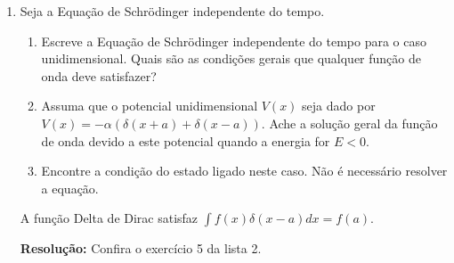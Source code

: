 \documentclass[a4paper, 12pt, notitlepage]{article}
\begin{document}
\begin{enumerate}
\item Seja a Equação de Schrödinger independente do tempo.

\begin{enumerate}
  \item Escreve a Equação de Schrödinger independente do tempo para o caso unidimensional. Quais são as condições gerais que qualquer função de onda deve satisfazer?
  \item Assuma que o potencial unidimensional $V(x)$ seja dado por $V(x) = -\alpha\left(\delta(x+a) + \delta(x-a)\right)$. Ache a solução geral da função de onda devido a este potencial quando a energia for $E < 0$.
  \item Encontre a condição do estado ligado neste caso. Não é necessário resolver a equação.
\end{enumerate}
A função Delta de Dirac satisfaz $\int f(x)\delta(x-a)dx = f(a)$.

\textbf{Resolução: }
Confira o exercício 5 da lista 2.

\end{enumerate}
\end{document}
